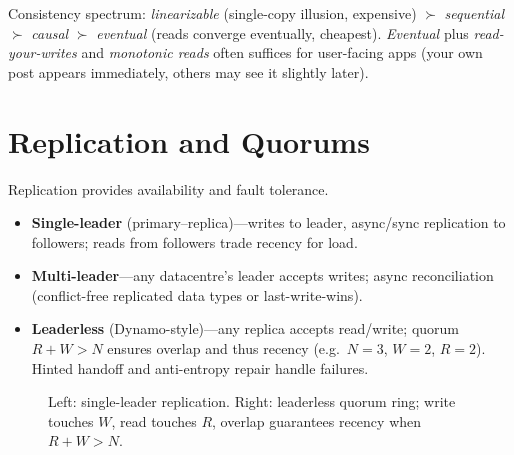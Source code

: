 Consistency spectrum: \emph{linearizable} (single-copy illusion, expensive) $\succ$ \emph{sequential} $\succ$ \emph{causal} $\succ$ \emph{eventual} (reads converge eventually, cheapest). \emph{Eventual} plus \emph{read-your-writes} and \emph{monotonic reads} often suffices for user-facing apps (your own post appears immediately, others may see it slightly later).

\section{Replication and Quorums}
\label{sec:replication}

Replication provides availability and fault tolerance.

\begin{itemize}
    \item \textbf{Single-leader} (primary--replica)---writes to leader, async/sync replication to followers; reads from followers trade recency for load.
    \item \textbf{Multi-leader}---any datacentre's leader accepts writes; async reconciliation (conflict-free replicated data types or last-write-wins).
    \item \textbf{Leaderless} (Dynamo-style)---any replica accepts read/write; quorum $R+W>N$ ensures overlap and thus recency (e.g.\ $N=3$, $W=2$, $R=2$). Hinted handoff and anti-entropy repair handle failures.
\end{itemize}

\begin{figure}[h]
\centering
{}
\caption{Left: single-leader replication. Right: leaderless quorum ring; write touches $W$, read touches $R$, overlap guarantees recency when $R+W>N$.}
\label{fig:replication}
\end{figure}

